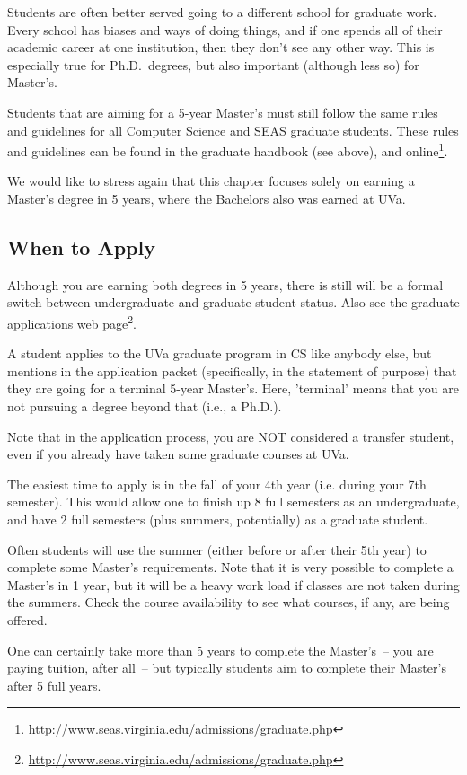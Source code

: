 \documentclass[10pt,letter]{book}
\newcommand{\myurl}[1]{\footnote{\scriptsize\url{#1}}}
\begin{document}
Students are often better served going to a different school for
graduate work.  Every school has biases and ways of doing things, and
if one spends all of their academic career at one institution, then
they don't see any other way.  This is especially true for
Ph.D.\ degrees, but also important (although less so) for Master's.

Students that are aiming for a 5-year Master's must still follow the
same rules and guidelines for all Computer Science and SEAS graduate
students.  These rules and guidelines can be found in the graduate
handbook (see above), and
online\myurl{http://www.seas.virginia.edu/admissions/graduate.php}.

We would like to stress again that this chapter focuses solely on
earning a Master's degree in 5 years, where the Bachelors also was
earned at UVa.


\subsection{When to Apply}

Although you are earning both degrees in 5 years, there is still will
be a formal switch between undergraduate and graduate student status.
Also see the graduate applications web
page\myurl{http://www.seas.virginia.edu/admissions/graduate.php}.

A student applies to the UVa graduate program in CS like anybody else,
but mentions in the application packet (specifically, in the statement
of purpose) that they are going for a terminal 5-year Master's.  Here,
'terminal' means that you are not pursuing a degree beyond that (i.e.,
a Ph.D.).

Note that in the application process, you are NOT considered a
transfer student, even if you already have taken some graduate courses
at UVa.

The easiest time to apply is in the fall of your 4th year (i.e. during
your 7th semester).  This would allow one to finish up 8 full
semesters as an undergraduate, and have 2 full semesters (plus
summers, potentially) as a graduate student.

Often students will use the summer (either before or after their 5th
year) to complete some Master's requirements.  Note that it is very
possible to complete a Master's in 1 year, but it will be a heavy work
load if classes are not taken during the summers.  Check the course
availability to see what courses, if any, are being offered.

One can certainly take more than 5 years to complete the Master's~--
you are paying tuition, after all~-- but typically students aim to
complete their Master's after 5 full years.
\end{document}
